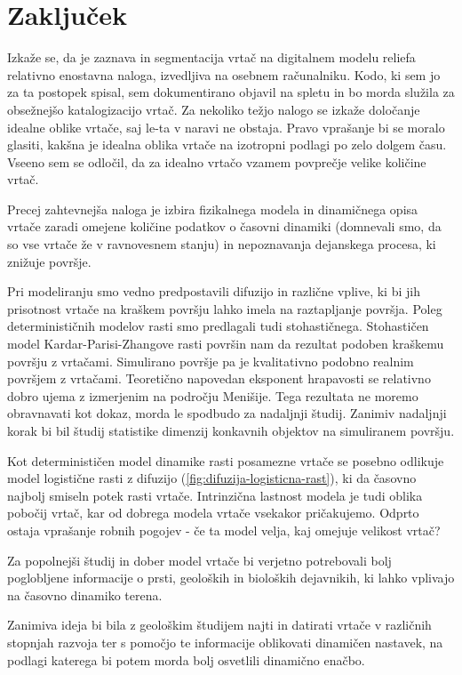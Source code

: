 \documentclass[a4paper, twoside, 12pt]{book}
\begin{document}
    \chapter{Zaključek}

    Izkaže se, da je zaznava in segmentacija vrtač na digitalnem modelu reliefa relativno enostavna naloga, izvedljiva na osebnem računalniku. Kodo, ki sem jo za ta postopek spisal, sem dokumentirano objavil na spletu in bo morda služila za obsežnejšo katalogizacijo vrtač.
    Za nekoliko težjo nalogo se izkaže določanje idealne oblike vrtače, saj le-ta v naravi ne obstaja. Pravo vprašanje bi se moralo glasiti, kakšna je idealna oblika vrtače na izotropni podlagi po zelo dolgem času. Vseeno sem se odločil, da za idealno vrtačo vzamem povprečje velike količine vrtač.

    Precej zahtevnejša naloga je izbira fizikalnega modela in dinamičnega opisa vrtače zaradi omejene količine podatkov o časovni dinamiki (domnevali smo, da so vse vrtače že v ravnovesnem stanju) in nepoznavanja dejanskega procesa, ki znižuje površje.

    Pri modeliranju smo vedno predpostavili difuzijo in različne vplive, ki bi jih prisotnost vrtače na kraškem površju lahko imela na raztapljanje površja. Poleg determinističnih modelov rasti smo predlagali tudi stohastičnega. Stohastičen model Kardar-Parisi-Zhangove rasti površin nam da rezultat podoben kraškemu površju z vrtačami. Simulirano površje pa je kvalitativno podobno realnim površjem z vrtačami. Teoretično napovedan eksponent hrapavosti se relativno dobro ujema z izmerjenim na področju Menišije. Tega rezultata ne moremo obravnavati kot dokaz, morda le spodbudo za nadaljnji študij. Zanimiv nadaljnji korak bi bil študij statistike dimenzij konkavnih objektov na simuliranem površju.

    Kot determinističen model dinamike rasti posamezne vrtače se posebno odlikuje model logistične rasti z difuzijo (\ref{fig:difuzija-logisticna-rast}), ki da časovno najbolj smiseln potek rasti vrtače. Intrinzična lastnost modela je tudi oblika pobočij vrtač, kar od dobrega modela vrtače vsekakor pričakujemo. Odprto ostaja vprašanje robnih pogojev - če ta model velja, kaj omejuje velikost vrtač?

    Za popolnejši študij in dober model vrtače bi verjetno potrebovali bolj poglobljene informacije o prsti, geoloških in bioloških dejavnikih, ki lahko vplivajo na časovno dinamiko terena.

Zanimiva ideja bi bila z geološkim študijem najti in datirati vrtače v različnih stopnjah razvoja ter s pomočjo te informacije oblikovati dinamičen nastavek, na podlagi katerega bi potem morda bolj osvetlili dinamično enačbo.
\end{document}
